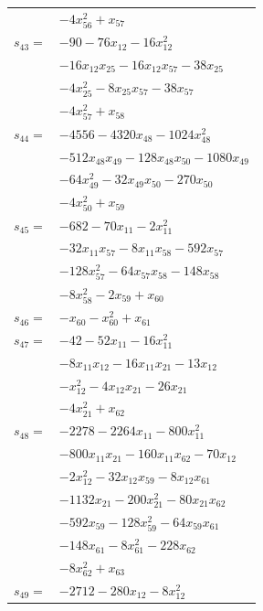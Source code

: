 \begin{longtable}{@{}r@{\;}l@{}}
 & \(\displaystyle -4x_{56}^{2} +x_{57}\) \\[3pt]
\(s_{43}=\) & \(\displaystyle -90 -76x_{12} -16x_{12}^{2}\) \\
 & \(\displaystyle -16x_{12}x_{25} -16x_{12}x_{57} -38x_{25}\) \\
 & \(\displaystyle -4x_{25}^{2} -8x_{25}x_{57} -38x_{57}\) \\
 & \(\displaystyle -4x_{57}^{2} +x_{58}\) \\[3pt]
\(s_{44}=\) & \(\displaystyle -4556 -4320x_{48} -1024x_{48}^{2}\) \\
 & \(\displaystyle -512x_{48}x_{49} -128x_{48}x_{50} -1080x_{49}\) \\
 & \(\displaystyle -64x_{49}^{2} -32x_{49}x_{50} -270x_{50}\) \\
 & \(\displaystyle -4x_{50}^{2} +x_{59}\) \\[3pt]
\(s_{45}=\) & \(\displaystyle -682 -70x_{11} -2x_{11}^{2}\) \\
 & \(\displaystyle -32x_{11}x_{57} -8x_{11}x_{58} -592x_{57}\) \\
 & \(\displaystyle -128x_{57}^{2} -64x_{57}x_{58} -148x_{58}\) \\
 & \(\displaystyle -8x_{58}^{2} -2x_{59} +x_{60}\) \\[3pt]
\(s_{46}=\) & \(\displaystyle -x_{60} -x_{60}^{2} +x_{61}\) \\[3pt]
\(s_{47}=\) & \(\displaystyle -42 -52x_{11} -16x_{11}^{2}\) \\
 & \(\displaystyle -8x_{11}x_{12} -16x_{11}x_{21} -13x_{12}\) \\
 & \(\displaystyle -x_{12}^{2} -4x_{12}x_{21} -26x_{21}\) \\
 & \(\displaystyle -4x_{21}^{2} +x_{62}\) \\[3pt]
\(s_{48}=\) & \(\displaystyle -2278 -2264x_{11} -800x_{11}^{2}\) \\
 & \(\displaystyle -800x_{11}x_{21} -160x_{11}x_{62} -70x_{12}\) \\
 & \(\displaystyle -2x_{12}^{2} -32x_{12}x_{59} -8x_{12}x_{61}\) \\
 & \(\displaystyle -1132x_{21} -200x_{21}^{2} -80x_{21}x_{62}\) \\
 & \(\displaystyle -592x_{59} -128x_{59}^{2} -64x_{59}x_{61}\) \\
 & \(\displaystyle -148x_{61} -8x_{61}^{2} -228x_{62}\) \\
 & \(\displaystyle -8x_{62}^{2} +x_{63}\) \\[3pt]
\(s_{49}=\) & \(\displaystyle -2712 -280x_{12} -8x_{12}^{2}\) \\

\end{longtable}
